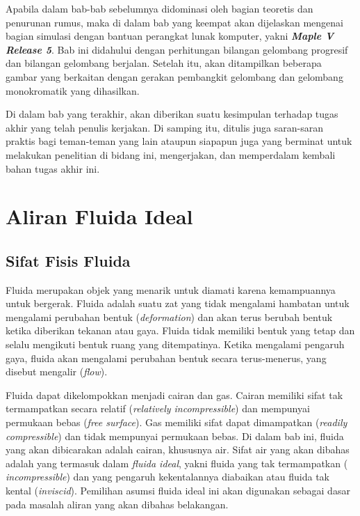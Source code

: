 \documentclass[12pt,a4paper]{report}
\begin{document}
Apabila dalam bab-bab sebelumnya didominasi oleh bagian teoretis dan
penurunan rumus, maka di dalam bab yang keempat akan dijelaskan mengenai
bagian simulasi dengan bantuan perangkat lunak komputer, yakni \textbf{%
\textit{Maple V Release 5}}. Bab ini didahului dengan perhitungan bilangan
gelombang progresif dan bilangan gelombang berjalan. Setelah itu, akan
ditampilkan beberapa gambar yang berkaitan dengan gerakan pembangkit
gelombang dan gelombang monokromatik yang dihasilkan.

Di dalam bab yang terakhir, akan diberikan suatu kesimpulan terhadap tugas
akhir yang telah penulis kerjakan. Di samping itu, ditulis juga saran-saran
praktis bagi teman-teman yang lain ataupun siapapun juga yang berminat untuk
melakukan penelitian di bidang ini, mengerjakan, dan memperdalam kembali
bahan tugas akhir ini.

\chapter{Aliran Fluida Ideal}

\section{Sifat Fisis Fluida}

Fluida merupakan objek yang menarik untuk diamati karena kemampuannya untuk
bergerak. Fluida adalah suatu zat yang tidak mengalami hambatan untuk
mengalami perubahan bentuk (\textit{deformation}) dan akan terus berubah
bentuk ketika diberikan tekanan atau gaya. Fluida tidak memiliki bentuk yang
tetap dan selalu mengikuti bentuk ruang yang ditempatinya. Ketika mengalami
pengaruh gaya, fluida akan mengalami perubahan bentuk secara terus-menerus,
yang disebut mengalir (\textit{flow}).

Fluida dapat dikelompokkan menjadi cairan dan gas. Cairan memiliki sifat tak
termampatkan secara relatif (\textit{relatively incompressible}) dan
mempunyai permukaan bebas (\textit{free surface}). Gas memiliki sifat dapat
dimampatkan (\textit{readily compressible}) dan tidak mempunyai permukaan
bebas. Di dalam bab ini, fluida yang akan dibicarakan adalah cairan,
khususnya air. Sifat air yang akan dibahas adalah yang termasuk dalam
\textit{fluida ideal}, yakni fluida yang tak termampatkan (\textit{%
incompressible}) dan yang pengaruh kekentalannya diabaikan atau
fluida tak kental (\textit{inviscid}). Pemilihan asumsi fluida
ideal ini akan digunakan sebagai dasar pada masalah aliran yang
akan dibahas belakangan.\cite{rs,wlh}
\end{document}

